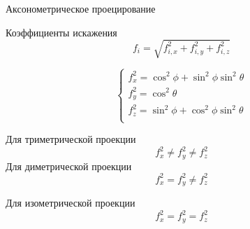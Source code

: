 \documentclass{beamer}
\begin{document}
	\begin{frame}{Аксонометрическое проецирование}

		Коэффициенты искажения
		\[
			f_i = \sqrt{f_{i,x}^2+f_{i,y}^2+f_{i,z}^2}
		\]

		\[
		\begin{cases}
			f_x^2 = \cos^2 \phi + \sin^2 \phi \sin^2 \theta \\
			f_y^2 = \cos^2 \theta \\
			f_z^2 = \sin^2 \phi + \cos^2 \phi \sin^2 \theta \\
		\end{cases}	
		\]

		Для триметрической проекции
		\[
			f_x^2 \neq f_y^2 \neq f_z^2
		\]
		Для диметрической проекции
		\[
			f_x^2 = f_y^2 \neq f_z^2
		\]

		Для изометрической проекции
		\[
			f_x^2 = f_y^2 = f_z^2
		\]
		
		
	\end{frame}
\end{document}
